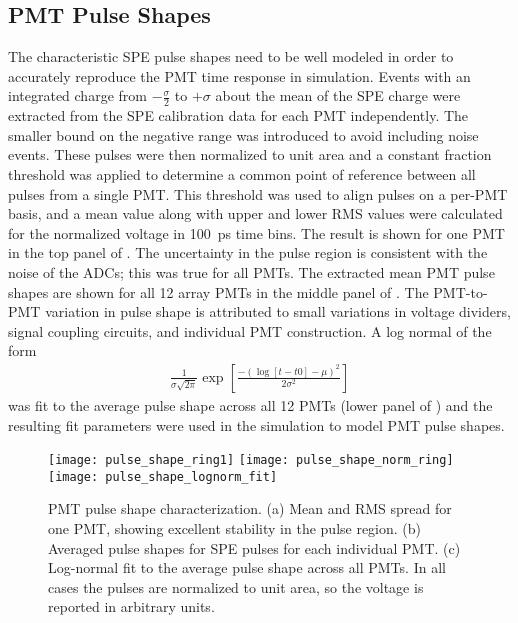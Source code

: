 \subsection{PMT Pulse Shapes}
\label{sec:pmtpulses}
The characteristic SPE pulse shapes need to be well modeled in order to accurately reproduce the PMT time response in simulation. 
Events with an integrated charge from $-\frac{\sigma}{2}$ to $+\sigma$ about the mean of the SPE charge were extracted from the SPE calibration data  for each PMT independently. The smaller bound on the negative range was introduced to avoid including noise events. These pulses were then normalized to unit area and a constant fraction threshold was applied to determine a common point of reference between all pulses from a single PMT.  
This threshold was used to align pulses on a per-PMT basis, and a mean value along with upper and lower RMS values were calculated for the normalized voltage in 100~ps time bins. The result is shown for one PMT in the top panel of . The uncertainty in the pulse region is consistent with the noise of the ADCs; this was true for all PMTs. The extracted mean PMT pulse shapes are shown for all 12 array PMTs in the middle panel of . The PMT-to-PMT variation in pulse shape is attributed to small variations in voltage dividers, signal coupling circuits, and individual PMT construction. A log normal of the form 
\begin{eqnarray}
\frac{1}{\sigma \sqrt{2\pi}}\exp{\left[\frac{-\left(\log[t-t0]-\mu\right)^2}{2\sigma^2}\right]}
\end{eqnarray}
was fit to the average pulse shape across all 12 PMTs (lower panel of )
and the resulting fit parameters were used in the simulation to model PMT pulse shapes.
	
\begin{figure}[!t]
	\centering
	\texttt{[image: pulse\_shape\_ring1]}
	\texttt{[image: pulse\_shape\_norm\_ring]}
	\texttt{[image: pulse\_shape\_lognorm\_fit]}
	\caption{PMT pulse shape characterization.   (a) 
	Mean and RMS spread for one PMT, showing excellent stability in the pulse region.  (b) Averaged pulse shapes for SPE pulses for each individual PMT. 
	(c) Log-normal fit to the average pulse shape across all PMTs. 
	In all cases the pulses are normalized to unit area, so the voltage is reported in arbitrary units.}
	\label{fig:spe-pulse-shape}
\end{figure}


